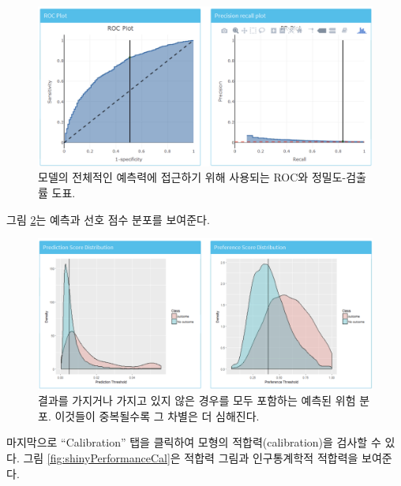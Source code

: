 \documentclass[11pt]{book}
\theoremstyle{definition}
\theoremstyle{definition}
\theoremstyle{definition}
\theoremstyle{remark}
\begin{document}
\begin{figure}

{\centering \includegraphics[width=1\linewidth]{images/PatientLevelPrediction/shiny/shinyPerformanceDisc} 

}

\caption{모델의 전체적인 예측력에 접근하기 위해 사용되는 ROC와 정밀도-검출률 도표.}\label{fig:shinyPerformanceDisc}
\end{figure}

그림 \ref{fig:shinyPerformanceDist}는 예측과 선호 점수 분포를 보여준다.

\begin{figure}

{\centering \includegraphics[width=1\linewidth]{images/PatientLevelPrediction/shiny/shinyPerformanceDist} 

}

\caption{결과를 가지거나 가지고 있지 않은 경우를 모두 포함하는 예측된 위험 분포. 이것들이 중복될수록 그 차별은 더 심해진다.}\label{fig:shinyPerformanceDist}
\end{figure}

마지막으로 ``Calibration'' 탭을 클릭하여 모형의 적합력(calibration)을
검사할 수 있다. 그림 \ref{fig:shinyPerformanceCal}은 적합력 그림과
인구통계학적 적합력을 보여준다.
\end{document}
